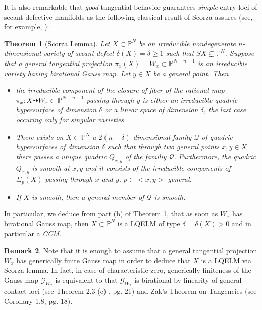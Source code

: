 \documentclass[11pt]{amsart}
\def\P{{\mathbb P}}
\theoremstyle{theorem} %
\newtheorem{Thm}{Theorem}[section]
\theoremstyle{definition}
\newtheorem{Remk}[Thm]{Remark}
\numberwithin{equation}{section}
\begin{document}
It is also remarkable that \textit{good} tangential behavior guarantees \textit{simple} entry loci of secant defective manifolds as the following classical result of Scorza assures (see, for example, \cite{Sco,Ru1}):


\begin{Thm}[Scorza Lemma]\label{scorza} Let $X\subset\P^N$ be an irreducible nondegenerate $n$-dimensional variety of secant defect $\delta(X)=\delta\ge1$ such that $SX\subsetneq \P^N$. Suppose that a general tangential projection $\pi_x(X)=W_x\subset\P^{N-n-1}$ is an irreducible variety having birational Gauss map. Let $y\in X$ be a general point. Then
\begin{itemize}
\item[(a)] the irreducible component of the closure of fiber of the rational map $\pi_x:X\dasharrow W_x\subset\P^{N-n-1}$ passing through $y$ is either an irreducible quadric hypersurface of dimension $\delta$ or a linear space of dimension $\delta$, the last case occuring only for singular varieties.
\item[(b)] There exists on $X\subset\P^N$ a $2(n-\delta)$-dimensional family $\mathcal Q$ of quadric hypersurfaces of dimension $\delta$ such that through two general points $x,y\in X$ there passes a unique quadric $Q_{x,y}$ of the familiy $\mathcal Q$. Furthermore, the quadric $Q_{x,y}$ is smooth at $x,y$ and it consists of the irreducible components of $\Sigma_p(X)$ passing through $x$ and $y$, $p\in<x,y>$ general.
\item[(c)] If $X$ is smooth, then a general member of $\mathcal Q$ is smooth.
\end{itemize}
\end{Thm}

In particular, we deduce from part (b) of Theorem \ref{scorza}, that as soon as $W_x$ has birational Gauss map, then $X\subset \P^{N}$ is a LQELM of type $\delta=\delta(X)>0$ and in particular a \textit{CCM}.

\begin{Remk}\label{gen_finite}
Note that it is enough to assume that a general tangential projection $W_x$ has generically finite Gauss map in order to deduce that $X$ is a LQELM via Scorza lemma. In fact, in case of characteristic zero, generically finiteness of the Gauss map $\mathcal G_{W_x}$ is equivalent to that $\mathcal G_{W_x}$ is birational by linearity of general contact loci (see \cite{Z1} Theorem 2.3 (c) , pg. 21) and Zak's Theorem on Tangencies (see \cite{Z1} Corollary 1.8, pg. 18).
\end{Remk}
\end{document}
